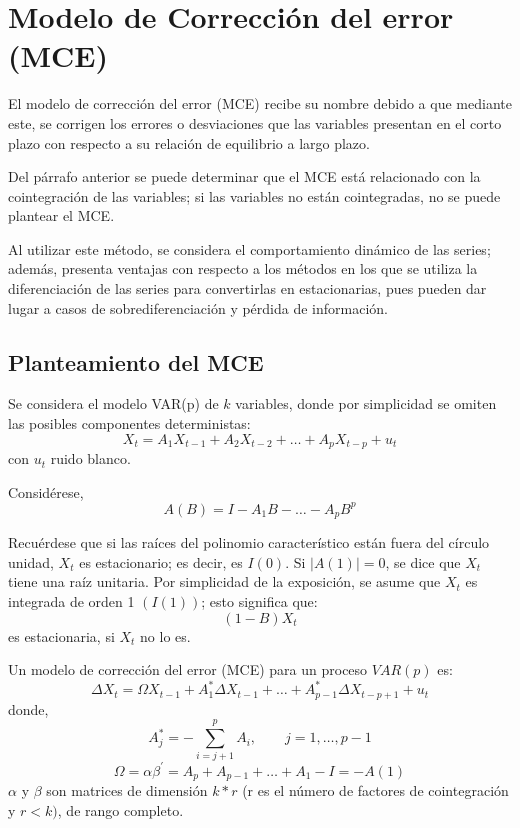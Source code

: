 \chapter{Modelo de Correcci\'{o}n del error (MCE)}
El modelo de correcci\'{o}n del error (MCE) recibe su nombre debido a que mediante este, se corrigen los errores o desviaciones que las variables presentan en el corto plazo con respecto a su relaci\'{o}n de equilibrio a largo plazo.\newline

Del p\'{a}rrafo anterior se puede determinar que el MCE est\'{a} relacionado con la cointegraci\'{o}n de las variables; si las variables no est\'{a}n cointegradas, no se puede plantear el MCE.\newline

Al utilizar este m\'{e}todo, se considera el comportamiento din\'{a}mico de las series; adem\'{a}s, presenta ventajas con respecto a los m\'{e}todos en los que se utiliza la diferenciaci\'{o}n de las series para convertirlas en estacionarias, pues pueden dar lugar a casos de sobrediferenciaci\'{o}n y p\'{e}rdida de informaci\'{o}n.

\section{Planteamiento del MCE}
Se considera el modelo VAR(p) de $k$ variables, donde por simplicidad se omiten las posibles componentes deterministas: 
\[
X_{t}=A_{1}X_{t-1}+A_{2}X_{t-2}+\ldots +A_{p}X_{t-p}+u_{t}
\]
con $u_{t}$ ruido blanco.\newline

Consid\'{e}rese, 
\[
A(B)=I-A_{1}B-\ldots -A_{p}B^{p}
\]

Recu\'{e}rdese que si las ra\'{i}ces del polinomio caracter\'{i}stico est\'{a}n fuera del c\'{i}rculo unidad, $X_{t}$ es estacionario; es decir, es $I(0)$. Si $|A(1)|=0$, se dice que $X_{t}$ tiene una ra\'{i}z unitaria. Por simplicidad de la exposici\'{o}n, se asume que $X_{t}$ es integrada de orden 1 $(I(1))$; esto significa que: 
\[
(1-B)X_{t}
\]
es estacionaria, si $X_{t}$ no lo es.\newline

Un modelo de correcci\'{o}n del error (MCE) para un proceso $VAR(p)$ es:
\[
\Delta X_{t}=\Omega X_{t-1}+A_{1}^{\ast}\Delta X_{t-1}+\ldots +A_{p-1}^{\ast}\Delta X_{t-p+1}+u_{t}
\]
donde, 
\[
A_{j}^{\ast }=-\sum\limits_{i=j+1}^p A_{i} ,\qquad j=1,\ldots ,p-1
\]
\[
\Omega =\alpha \beta^{'} = A_{p}+A_{p-1}+\ldots +A_{1}-I=-A(1)
\]
$\alpha$ y $\beta$ son matrices de dimensi\'{o}n $k*r$ (r es el n\'{u}mero de factores de cointegraci\'{o}n y $r<k)$, de rango completo.\newline

